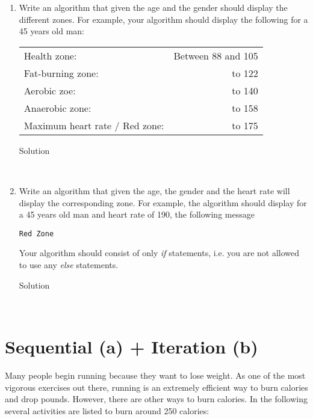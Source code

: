 \documentclass[11pt,a4paper]{article}
\begin{document}
\begin{enumerate}[label=(\alph*)]
  \item Write an algorithm that given the age and the gender should display the different zones. For example,
your algorithm should display the following for a 45 years old man:

\begin{tabular}{l r}
  Health zone: & Between 88 and 105 \\
  Fat-burning zone: & to 122 \\
  Aerobic zoe: & to 140 \\
  Anaerobic zone: & to 158 \\
  Maximum heart rate / Red zone: & to 175 \\
\end{tabular}

\begin{description}
  \item[Solution]  \hfill \\
  
\end{description}

\newpage
\item Write an algorithm that given the age, the gender and the heart rate will display the corresponding
zone. For example, the algorithm should display for a 45 years old man and heart rate of 190, the
following message
\begin{verbatim}
Red Zone
\end{verbatim}
Your algorithm should consist of only \emph{if} statements, i.e. you are not allowed to use any \emph{else}
statements.

\begin{description}
  \item[Solution]  \hfill \\
  
\end{description}
\end{enumerate}

\newpage

\section{Sequential (a) + Iteration (b)}

Many people begin running because they want to lose weight. As one of the most vigorous exercises
out there, running is an extremely efficient way to burn calories and drop pounds. However, there
are other ways to burn calories. In the following several activities are listed to burn around 250
calories:
\end{document}
